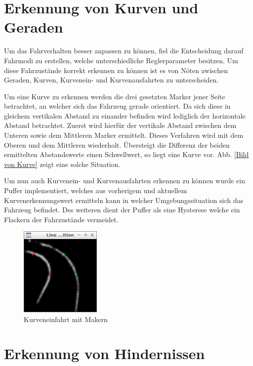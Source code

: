 \section{Erkennung von Kurven und Geraden}
\label{sec:kurvenerkennung}
Um das Fahrverhalten besser anpassen zu können, fiel die Entscheidung darauf Fahrmodi zu erstellen, welche unterschiedliche Reglerparameter besitzen. Um diese Fahrzustände korrekt erkennen zu können ist es von Nöten zwischen Geraden, Kurven, Kurvenein- und Kurvenausfahrten zu unterscheiden.

Um eine Kurve zu erkennen werden die drei gesetzten Marker jener Seite betrachtet, an welcher sich das Fahrzeug gerade orientiert. Da sich diese in gleichem vertikalen Abstand zu einander befinden wird lediglich der horizontale Abstand betrachtet. Zuerst wird hierfür der vertikale Abstand zwischen dem Unteren sowie dem Mittleren Marker ermittelt. Dieses Verfahren wird mit dem Oberen und dem Mittleren wiederholt. Übersteigt die Differenz der beiden ermittelten Abstandswerte einen Schwellwert, so liegt eine Kurve vor. Abb. \ref{Bild von Kurve} zeigt eine solche Situation.

Um nun auch Kurvenein- und Kurvenausfahrten erkennen zu können wurde ein Puffer implementiert, welches aus vorherigem und aktuellem Kurvenerkennungswert ermitteln kann in welcher Umgebungssituation sich das Fahrzeug befindet. Des weiteren dient der Puffer als eine Hysterese welche ein Flackern der Fahrzustände vermeidet.

\begin{figure}[ht]
	\centering
	\includegraphics[width=0.35\textwidth]{images/curve_bw.png}
	\caption{Kurveneinfahrt mit Makern}
\end{figure}
\label{Bild von Kurve}

\section{Erkennung von Hindernissen}
\label{sec:hinderniserkennung}

